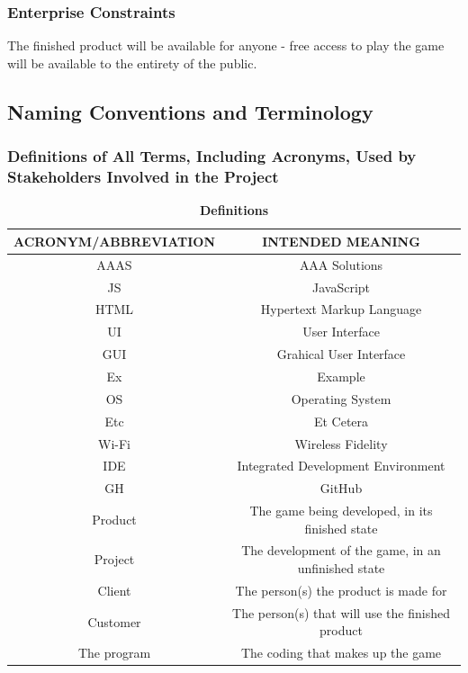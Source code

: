 \documentclass[12pt, titlepage]{article}
\begin{document}
\subsubsection{Enterprise Constraints}

The finished product will be available for anyone - free access to play the game will be available to the entirety of the public.

\subsection{Naming Conventions and Terminology}

\subsubsection{Definitions of All Terms, Including Acronyms, Used by Stakeholders Involved in the Project}
\begin{table}[H]
\caption{\bf Definitions}
\begin{center}
\begin{tabular}{|c|c|}
\hline
ACRONYM/ABBREVIATION & INTENDED MEANING\\
\hline
AAAS & AAA Solutions\\
\hline
JS & JavaScript\\
\hline
HTML &Hypertext Markup Language\\
\hline
UI & User Interface\\
\hline
GUI & Grahical User Interface\\
\hline
Ex & Example\\
\hline
OS & Operating System\\
\hline
Etc & Et Cetera\\
\hline
Wi-Fi & Wireless Fidelity\\
\hline
IDE & Integrated Development Environment\\
\hline
GH & GitHub\\
\hline
Product & The game being developed, in its finished state\\
\hline
Project & The development of the game, in an unfinished state\\
\hline
Client & The person(s) the product is made for\\
\hline
Customer & The person(s) that will use the finished product\\
\hline
The program & The coding that makes up the game\\
\hline
\end{tabular}
\end{center}
\label{default}
\end{table}%
\end{document}
